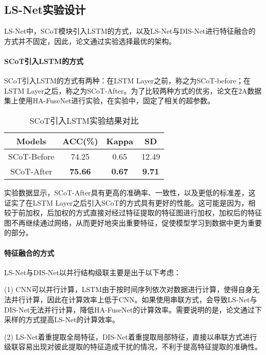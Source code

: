\subsection{LS-Net实验设计}

LS-Net中，SCoT模块引入LSTM的方式，以及LS-Net与DIS-Net进行特征融合的方式并不固定，因此，论文通过实验选择最优的架构。

\paragraph{SCoT引入LSTM的方式}

SCoT引入LSTM的方式有两种：在LSTM Layer之前，称之为SCoT-before；在LSTM Layer之后，称之为SCoT-After。为了比较两种方式的优劣，论文在2A数据集上使用HA-FuseNet进行实验，在实验中，固定了相关的超参数。
\begin{table}[ht]
    \centering
    \caption{SCoT引入LSTM实验结果对比}
    \label{tab:ls}
    \begin{tabularx}{\textwidth}{CCCC}
      \toprule
      Models & ACC(\%) & Kappa & SD \\
      \midrule
      SCoT-Before & 74.25 & 0.65 & 12.49 \\
      SCoT-After & \textbf{75.66} & \textbf{0.67} & \textbf{9.71} \\
      \bottomrule
    \end{tabularx}
\end{table}

实验数据显示，SCoT-After具有更高的准确率、一致性，以及更低的标准差，这证实了在LSTM Layer之后引入SCoT的方式具有更好的性能。这可能是因为，相较于前加权，后加权的方式直接对经过特征提取的特征图进行加权，加权后的特征图不再继续通过网络，从而更好地突出重要特征，促使模型学习到数据中更为重要的部分。

\paragraph{特征融合的方式}

LS-Net与DIS-Net以并行结构级联主要是出于以下考虑：

(1) CNN可以并行计算，LSTM由于按时间序列依次对数据进行计算，使得自身无法并行计算，因此在计算效率上低于CNN。如果使用串联方式，会导致LS-Net与DIS-Net无法并行计算，降低HA-FuseNet的计算效率。需要说明的是，论文通过下采样的方式提高LS-Net的计算效率。

(2) LS-Net着重提取全局特征，DIS-Net着重提取局部特征，直接以串联方式进行级联容易出现对彼此提取的特征造成干扰的情况，不利于提高特征提取的准确性。

